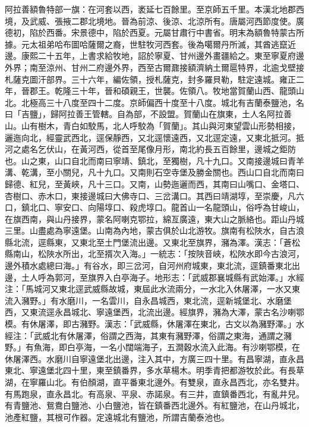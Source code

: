 \begin{pinyinscope}
阿拉善額魯特部一旗：在河套以西，袤延七百餘里。至京師五千里。本漢北地郡西境，及武威、張掖二郡北境地。晉為前涼、後涼、北涼所有。唐屬河西節度使。廣德初，陷於西番。宋景德中，陷於西夏。元屬甘肅行中書省。明末為額魯特蒙古所據。元太祖弟哈布圖哈薩爾之裔，世駐牧河西套。後為噶爾丹所滅，其酋逃竄近邊。康熙二十五年，上書求給牧地，詔於寧夏、甘州邊外畫疆給之。東至寧夏府邊外界；南至涼州、甘州二府邊外界，西至古爾鼐接額濟納土爾扈特界，北逾戈壁接札薩克圖汗部界。三十六年，編佐領，授札薩克，封多羅貝勒，駐定遠城。雍正二年，晉郡王。乾隆三十年，晉和碩親王，世襲。佐領八。牧地當賀蘭山西、龍頭山北。北極高三十八度至四十二度。京師偏西十度至十八度。城北有吉蘭泰鹽池，名曰「吉鹽」，歸阿拉善王管轄。自為部，不設盟。賀蘭山在旗東，土人名阿拉善山。山有樹木，青白如駮馬，北人呼駮為「賀蘭」。其山與河東望雲山形勢相接，邐迤向北，經靈武西北，逕保靜西，又北逕懷遠西，又北逕定遠，又東北抵河。抵河之處名乞伏山，在黃河西，從首至尾像月形，南北約長五百餘里，邊城之鉅防也。山之東，山口自北而南曰寧靖、鎮北，至獨樹，凡十九口。又南接邊城曰青羊溝、乾溝，至小關兒，凡十九口。又南則石空寺堡及勝金關也。西山口自北而南曰歸德、紅兒，至黃峽，凡十三口。又南，山勢迤邐而西，其南曰山嘴口、金塔口、杏樹口、赤木口，東接邊城曰大佛寺口、三岔溝口。其西曰靖湖埻，至崇慶，凡六口，鎮北口、寧安口、向陽埻口、殺虎埻口。龍首山一名龍頭山，俗呼為甘峻山，在旗西南，與山丹接界，蒙名阿喇克鄂拉，綿亙廣遠，東大山之脈絡也。距山丹城三里。山盡處為寧遠堡。山南為內地，蒙古俱於山北游牧。旗南有松陜水，自古浪縣北流，逕縣東，又東北至土門堡流出邊。又東北至旗界，瀦為澤。漢志：「蒼松縣南山，松陜水所出，北至揟次入海。」一統志：「按陜音峽，松陜水即今古浪河，邊外積水處總曰海。」有谷水，即三岔河，自河州府城東，東北流，逕鎮番東北出邊，土人呼為郭河，至旗界入白亭海子。地形志：「武威郡襄城縣有武始澤。」水經注：「馬城河又東北逕武威縣故城，東屆此水流兩分，一水北入休屠澤，一水又東流入瀦野。」有水磨川，一名雲川，自永昌城西，東北流，逕新城堡北、水磨堡西，又東流逕永昌城北、寧遠堡西，北流出邊。經旗界，瀦為大澤，蒙古名沙喇鄂模。有休屠澤，即古瀦野。漢志：「武威縣，休屠澤在東北，古文以為瀦野澤。」水經注：「武威北有休屠澤，俗謂之西海，其東有瀦野澤，俗謂之東海，通謂之瀦野。」有魚海，即白亭海，一名小闊端海子，五澗穀水流入此海。有沙喇鄂模，在休屠澤西。水磨川自寧遠堡北出邊，注入其中，方廣三四十里。有昌寧湖，直永昌東北、寧遠堡北四十里，東至鎮番界，多水草楊木。明季青把都游牧於此。有長草湖，在寧羅山北。有伯顏湖，直平番東北邊外。有雙泉，直永昌西北，亦名雙井。有馬跑泉，直永昌北。有高泉、平泉、赤諾泉。有三井，直鎮番西北，有亂井兒。有青鹽池、鴛鴦白鹽池、小白鹽池，皆在鎮番西北邊外。有紅鹽池，在山丹城北，池產紅鹽，其根可作器。定遠城北有鹽池，所謂吉蘭泰池也。


\end{pinyinscope}
